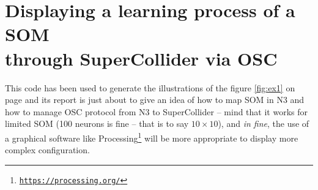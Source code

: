 
\section{Displaying a learning process of a SOM \\through SuperCollider via OSC}
\label{ann:color}

\bigskip

This code has been used to generate the illustrations of the figure \ref{fig:ex1} on page \pageref{fig:ex1} and its report is just about to give an idea of how to map SOM in N3 and how to manage OSC protocol from N3 to SuperCollider -- mind that it works for limited SOM (100 neurons is fine -- that is to say $10\times10$), and
\textit{in fine}, the use of a graphical software like Processing\footnote{\href{https://processing.org/}{\texttt{\scriptsize https://processing.org/}}} will be more appropriate to display more complex configuration.

\bigskip

